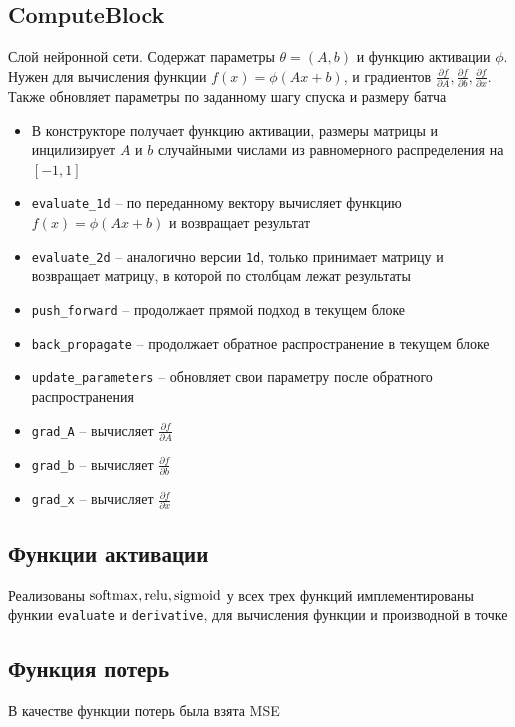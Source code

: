 \documentclass{article}
\begin{document}
\subsection{ComputeBlock}
Слой нейронной сети. Содержат параметры $\theta = (A, b)$ и функцию активации $\phi$. Нужен для вычисления функции $f(x) = \phi(Ax + b)$, и градиентов $\frac{\partial f}{\partial A}, \frac{\partial f}{\partial b}, \frac{\partial f}{\partial x}$. Также обновляет параметры по заданному шагу спуска и размеру батча
\begin{itemize}
    \item В конструкторе получает функцию активации, размеры матрицы и инцилизирует $A$ и $b$ случайными числами из равномерного распределения на $[-1, 1]$
    \item \texttt{evaluate\_1d} -- по переданному вектору вычисляет функцию $f(x) = \phi(Ax + b)$ и возвращает результат
    \item \texttt{evaluate\_2d} -- аналогично версии \texttt{1d}, только принимает матрицу и возвращает матрицу, в которой по столбцам лежат результаты
    \item \texttt{push\_forward} -- продолжает прямой подход в текущем блоке
    \item \texttt{back\_propagate} -- продолжает обратное распространение в текущем блоке
    \item \texttt{update\_parameters} -- обновляет свои параметру после обратного распространения
    \item \texttt{grad\_A} -- вычисляет $\frac{\partial f}{\partial A}$
    \item \texttt{grad\_b} -- вычисляет $\frac{\partial f}{\partial b}$
    \item \texttt{grad\_x} -- вычисляет $\frac{\partial f}{\partial x}$
\end{itemize}

\subsection{Функции активации}

Реализованы $\operatorname{softmax}, \operatorname{relu}, \operatorname{sigmoid}$ у всех трех функций имплементированы функии \texttt{evaluate} и \texttt{derivative}, для вычисления функции и производной в точке

\subsection{Функция потерь}
В качестве функции потерь была взята MSE
\end{document}
